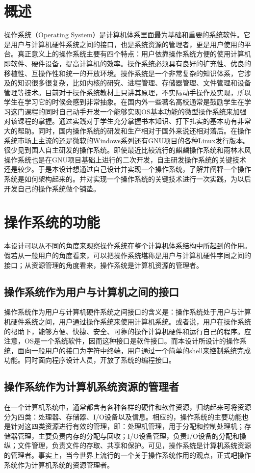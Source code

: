 \documentclass[UTF8,nofonts,cs4size]{ctexrep}
\begin{document}
\section{概述}
操作系统（Operating System）是计算机体系里面最为基础和重要的系统软件。它是用户与计算机硬件系统之间的接口，也是系统资源的管理者，更是用户使用的平台。真正意义上的操作系统主要有四个特点：用户依靠操作系统方便的使用计算机即软件、硬件设备，提高计算机的效率。操作系统必须具有良好的扩充性、优良的移植性、互操作性和统一的开放环境。操作系统是一个非常复杂的知识体系，它涉及的知识很多很复杂，比如内核的研究、进程管理、存储器管理、文件管理和设备管理等技术。目前对于操作系统教材上只讲其原理，不实际动手操作及实现，所以学生在学习它的时候会感到非常抽象。在国内外一些著名高校通常是鼓励学生在学习这门课程的同时自己动手开发一个能够实现OS基本功能的微型操作系统来加强对该课程的掌握。通过实践对于学生充分掌握书本知识、打下扎实的基本功有非常大的帮助。同时，国内操作系统的研发和生产相对于国外来说还相对落后。在操作系统市场上主流的还是微软的Windows系列还有GNU项目的各种Linux发行版本。很少见到国人自主研发的操作系统。即使最近比较流行的麒麟操作系统和雨林木风操作系统也是在GNU项目基础上进行的二次开发，自主研发操作系统的关键技术还是较少。于是本设计想通过自己设计并实现一个操作系统，了解并阐释一个操作系统是如何架构起来的。并对实现一个操作系统的关键技术进行一次实践，为以后开发自己的操作系统做个铺垫。
\section{操作系统的功能}
本设计可以从不同的角度来观察操作系统在整个计算机体系结构中所起到的作用。假若从一般用户的角度看来，可以把操作系统堪称是用户与计算机硬件字同之间的接口；从资源管理的角度看来，操作系统是计算机资源的管理者。
\subsection{操作系统作为用户与计算机之间的接口}
操作系统作为用户与计算机硬件系统之间接口的含义是：操作系统处于用户与计算机硬件系统之间，用户通过操作系统来使用计算机系统。或者说，用户在操作系统的帮助下，能够方便、快捷、安全、可靠的操作计算机硬件和运行自己的程序。应注意，OS是一个系统软件，因而这种接口是软件接口。而本设计所设计的操作系统，面向一般用户的接口为字符中终端，用户通过一个简单的shell来控制系统完成功能。同时面向程序设计人员，开放了系统的编程接口。
\subsection{操作系统作为计算机系统资源的管理者}
在一个计算机系统中，通常都含有各种各样的硬件和软件资源，归纳起来可将资源分为四类：处理器、存储器、I/O设备以及信息。相应的，操作系统的主要功能也是针对这四类资源进行有效的管理，即：处理机管理，用于分配和控制处理机；存储器管理，主要负责内存的分配与回收；I/O设备管理，负责I/O设备的分配和操纵；文件管理，负责文件的存取、共享和保护。可见，操作系统是计算机系统资源的管理者。事实上，当今世界上流行的一个关于操作系统作用的观点，正式吧操作系统作为计算机系统的资源管理者。
\end{document}
